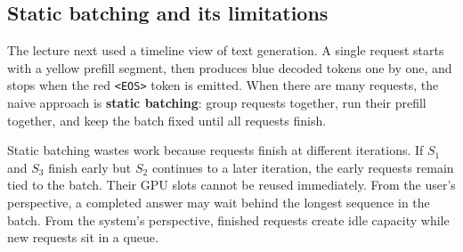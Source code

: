 \documentclass[twoside]{article}
\newcommand{\EOS}{\texttt{<EOS>}}
\begin{document}
\subsection{Static batching and its limitations}

The lecture next used a timeline view of text generation.  A single request starts with a yellow prefill segment, then produces blue decoded tokens one by one, and stops when the red \EOS{} token is emitted.  When there are many requests, the naive approach is \textbf{static batching}: group requests together, run their prefill together, and keep the batch fixed until all requests finish.

Static batching wastes work because requests finish at different iterations.  If \(S_1\) and \(S_3\) finish early but \(S_2\) continues to a later iteration, the early requests remain tied to the batch.  Their GPU slots cannot be reused immediately.  From the user's perspective, a completed answer may wait behind the longest sequence in the batch.  From the system's perspective, finished requests create idle capacity while new requests sit in a queue.
\end{document}
